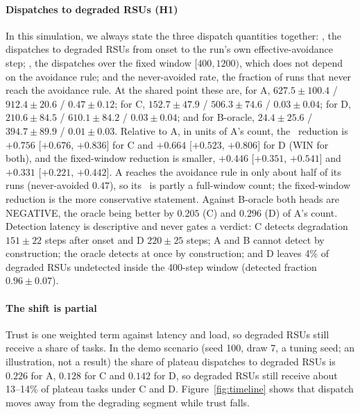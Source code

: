 \paragraph*{Dispatches to degraded RSUs (H1)}
In this simulation, we always state the three dispatch quantities together: \nav, the dispatches to degraded RSUs from onset to the run's own effective-avoidance step; \nwin, the dispatches over the fixed window $[400,1200)$, which does not depend on the avoidance rule; and the never-avoided rate, the fraction of runs that never reach the avoidance rule.
At the shared point these are, for A, $627.5\pm100.4$ / $912.4\pm20.6$ / $0.47\pm0.12$; for C, $152.7\pm47.9$ / $506.3\pm74.6$ / $0.03\pm0.04$; for D, $210.6\pm84.5$ / $610.1\pm84.2$ / $0.03\pm0.04$; and for B-oracle, $24.4\pm25.6$ / $394.7\pm89.9$ / $0.01\pm0.03$.
Relative to A, in units of A's count, the \nav\ reduction is $+0.756$ [$+0.676$, $+0.836$] for C and $+0.664$ [$+0.523$, $+0.806$] for D (WIN for both), and the fixed-window reduction is smaller, $+0.446$ [$+0.351$, $+0.541$] and $+0.331$ [$+0.221$, $+0.442$].
A reaches the avoidance rule in only about half of its runs (never-avoided $0.47$), so its \nav\ is partly a full-window count; the fixed-window reduction is the more conservative statement.
Against B-oracle both heads are NEGATIVE, the oracle being better by $0.205$ (C) and $0.296$ (D) of A's count.
Detection latency is descriptive and never gates a verdict: C detects degradation $151\pm22$ steps after onset and D $220\pm25$ steps; A and B cannot detect by construction; the oracle detects at once by construction; and D leaves 4\% of degraded RSUs undetected inside the 400-step window (detected fraction $0.96\pm0.07$).
\latcaveat

\paragraph*{The shift is partial}
Trust is one weighted term against latency and load, so degraded RSUs still receive a share of tasks.
In the demo scenario (seed 100, draw 7, a tuning seed; an illustration, not a result) the share of plateau dispatches to degraded RSUs is $0.226$ for A, $0.128$ for C and $0.142$ for D, so degraded RSUs still receive about 13--14\% of plateau tasks under C and D.
Figure~\ref{fig:timeline} shows that dispatch moves away from the degrading segment while trust falls.

